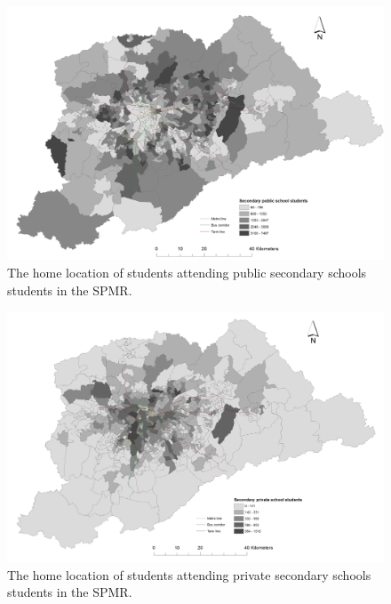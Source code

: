 \documentclass[]{article}
\begin{document}
\begin{figure}
\includegraphics[width=0.7\linewidth]{med_pu} \caption{The home location of students attending public secondary schools students in the SPMR.}\label{fig:unnamed-chunk-5}
\end{figure}\begin{figure}
\includegraphics[width=0.7\linewidth]{med_pr} \caption{The home location of students attending private secondary schools students in the SPMR.}\label{fig:unnamed-chunk-6}
\end{figure}
\end{document}
